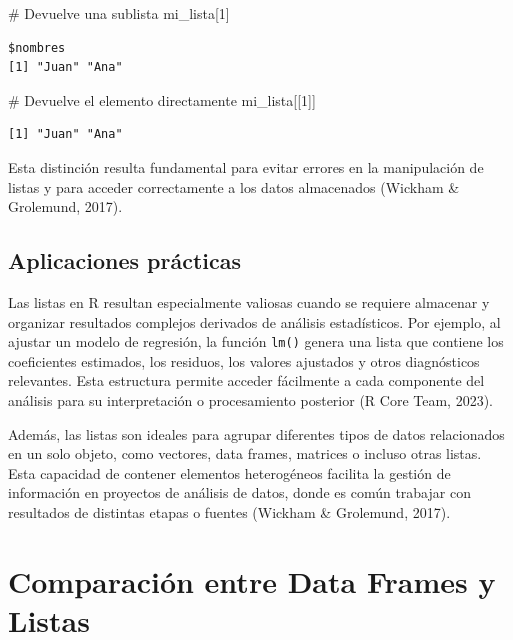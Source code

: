 \documentclass[
  spanish,
  a4paper,
  DIV=11,
  numbers=noendperiod,
  onepage,
  openany]{scrreprt}
\newenvironment{Shaded}{\begin{snugshade}}{\end{snugshade}}
\newcommand{\CommentTok}[1]{\textcolor[rgb]{0.37,0.37,0.37}{#1}}
\newcommand{\DecValTok}[1]{\textcolor[rgb]{0.68,0.00,0.00}{#1}}
\newcommand{\NormalTok}[1]{\textcolor[rgb]{0.00,0.23,0.31}{#1}}
\begin{document}
\begin{Shaded}
\begin{Highlighting}[]
\CommentTok{\# Devuelve una sublista}
\NormalTok{mi\_lista[}\DecValTok{1}\NormalTok{]}
\end{Highlighting}
\end{Shaded}

\begin{verbatim}
$nombres
[1] "Juan" "Ana" 
\end{verbatim}

\begin{Shaded}
\begin{Highlighting}[]
\CommentTok{\# Devuelve el elemento directamente}
\NormalTok{mi\_lista[[}\DecValTok{1}\NormalTok{]]}
\end{Highlighting}
\end{Shaded}

\begin{verbatim}
[1] "Juan" "Ana" 
\end{verbatim}

Esta distinción resulta fundamental para evitar errores en la
manipulación de listas y para acceder correctamente a los datos
almacenados (Wickham \& Grolemund, 2017).

\subsection{Aplicaciones prácticas}\label{aplicaciones-pruxe1cticas-1}

Las listas en R resultan especialmente valiosas cuando se requiere
almacenar y organizar resultados complejos derivados de análisis
estadísticos. Por ejemplo, al ajustar un modelo de regresión, la función
\texttt{lm()} genera una lista que contiene los coeficientes estimados,
los residuos, los valores ajustados y otros diagnósticos relevantes.
Esta estructura permite acceder fácilmente a cada componente del
análisis para su interpretación o procesamiento posterior (R Core Team,
2023).

Además, las listas son ideales para agrupar diferentes tipos de datos
relacionados en un solo objeto, como vectores, data frames, matrices o
incluso otras listas. Esta capacidad de contener elementos heterogéneos
facilita la gestión de información en proyectos de análisis de datos,
donde es común trabajar con resultados de distintas etapas o fuentes
(Wickham \& Grolemund, 2017).

\section{Comparación entre Data Frames y
Listas}\label{comparaciuxf3n-entre-data-frames-y-listas}
\end{document}
